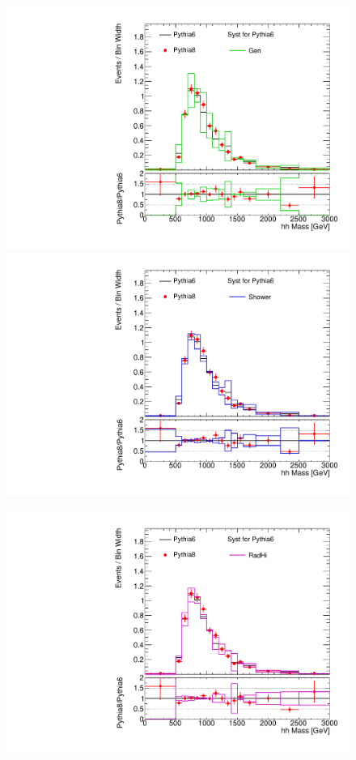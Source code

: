 \begin{figure}[!h]
\begin{center}
\includegraphics[scale=0.33]{./figures/boosted/TTBarPy6VsPy8/TTBarPy6VsPy8_SR_hhMassRebin1_gen}  
\includegraphics[scale=0.33]{./figures/boosted/TTBarPy6VsPy8/TTBarPy6VsPy8_SR_hhMassRebin1_shower} \\
\par\medskip
\includegraphics[scale=0.33]{./figures/boosted/TTBarPy6VsPy8/TTBarPy6VsPy8_SR_hhMassRebin1_radhi}

\end{center}
\end{figure}
